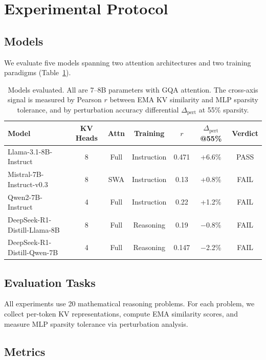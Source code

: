 \documentclass[11pt]{article}
\begin{document}
\section{Experimental Protocol}

\subsection{Models}

We evaluate five models spanning two attention architectures and two training paradigms (Table~\ref{tab:models}).

\begin{table}[h]
\centering
\caption{Models evaluated. All are 7--8B parameters with GQA attention. The cross-axis signal is measured by Pearson $r$ between EMA KV similarity and MLP sparsity tolerance, and by perturbation accuracy differential $\Delta_\text{pert}$ at 55\% sparsity.}
\label{tab:models}
\small
\begin{tabular}{@{}lcccccc@{}}
\toprule
Model & KV Heads & Attn & Training & $r$ & $\Delta_\text{pert}$@55\% & Verdict \\
\midrule
Llama-3.1-8B-Instruct & 8 & Full & Instruction & 0.471 & +6.6\% & PASS \\
Mistral-7B-Instruct-v0.3 & 8 & SWA & Instruction & 0.13 & +0.8\% & FAIL \\
Qwen2-7B-Instruct & 4 & Full & Instruction & 0.22 & +1.2\% & FAIL \\
DeepSeek-R1-Distill-Llama-8B & 8 & Full & Reasoning & 0.19 & $-$0.8\% & FAIL \\
DeepSeek-R1-Distill-Qwen-7B & 4 & Full & Reasoning & 0.147 & $-$2.2\% & FAIL \\
\bottomrule
\end{tabular}
\end{table}

\subsection{Evaluation Tasks}

All experiments use 20 mathematical reasoning problems. For each problem, we collect per-token KV representations, compute EMA similarity scores, and measure MLP sparsity tolerance via perturbation analysis.

\subsection{Metrics}
\end{document}
